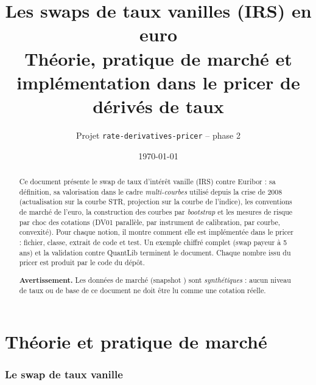 \documentclass[11pt,a4paper]{article}
\title{\textbf{Les swaps de taux vanilles (IRS) en euro}\\[0.4em]
  \large Théorie, pratique de marché et implémentation dans le pricer de dérivés de taux}
\author{Projet \texttt{rate-derivatives-pricer} -- phase 2}
\date{\today}
\newcommand{\estr}{\texorpdfstring{\texteuro STR}{EUR STR}}
\newcommand{\code}[1]{\texttt{\detokenize{#1}}}
\theoremstyle{plain}
\theoremstyle{definition}
\theoremstyle{remark}
\begin{document}
\maketitle
\thispagestyle{empty}

\begin{abstract}
\noindent
Ce document présente le swap de taux d'intérêt vanille (IRS) contre Euribor : sa définition, sa
valorisation dans le cadre \emph{multi-courbes} utilisé depuis la crise de 2008 (actualisation sur
la courbe \estr{}, projection sur la courbe de l'indice), les conventions de marché de l'euro, la
construction des courbes par \emph{bootstrap} et les mesures de risque par choc des cotations
(DV01 parallèle, par instrument de calibration, par courbe, convexité). Pour chaque notion, il montre
comment elle est implémentée dans le pricer : fichier, classe, extrait de code et test. Un exemple
chiffré complet (swap payeur à 5 ans) et la validation contre QuantLib terminent le document. Chaque
nombre issu du pricer est produit par le code du dépôt.

\medskip\noindent
\textbf{Avertissement.} Les données de marché (snapshot \code{EUR_2026-10-19}) sont
\emph{synthétiques} : aucun niveau de taux ou de base de ce document ne doit être lu comme une
cotation réelle.
\end{abstract}

\newpage
{\setlength{\parskip}{0pt}\tableofcontents}
\newpage

\part{Théorie et pratique de marché}

\section{Le swap de taux vanille}\label{sec:swap}
\end{document}

